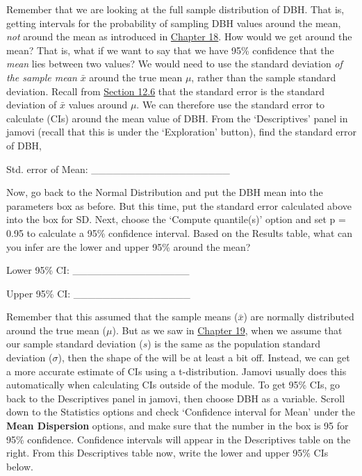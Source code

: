 \documentclass[
  openany]{krantz}
\begin{document}
Remember that we are looking at the full sample distribution of DBH.
That is, getting intervals for the probability of sampling DBH values around the mean, \emph{not}  around the mean as introduced in \protect\hyperlink{Chapter_18}{Chapter 18}.
How would we get  around the mean?
That is, what if we want to say that we have 95\% confidence that the \emph{mean} lies between two values?
We would need to use the standard deviation \emph{of the sample mean} \(\bar{x}\) around the true mean \(\mu\), rather than the sample standard deviation.
Recall from \protect\hyperlink{the-standard-error}{Section 12.6} that the standard error is the standard deviation of \(\bar{x}\) values around \(\mu\).
We can therefore use the standard error to calculate  (CIs) around the mean value of DBH.
From the `Descriptives' panel in jamovi (recall that this is under the `Exploration' button), find the standard error of DBH,

Std. error of Mean: \_\_\_\_\_\_\_\_\_\_\_\_\_\_\_\_\_\_\_

Now, go back to the  Normal Distribution and put the DBH mean into the parameters box as before.
But this time, put the standard error calculated above into the box for SD.
Next, choose the `Compute quantile(s)' option and set p = 0.95 to calculate a 95\% confidence interval.
Based on the Results table, what can you infer are the lower and upper 95\%  around the mean?

Lower 95\% CI: \_\_\_\_\_\_\_\_\_\_\_\_\_\_\_\_

Upper 95\% CI: \_\_\_\_\_\_\_\_\_\_\_\_\_\_\_\_

Remember that this assumed that the sample means (\(\bar{x}\)) are normally distributed around the true mean (\(\mu\)).
But as we saw in \protect\hyperlink{Chapter_19}{Chapter 19}, when we assume that our sample standard deviation (\(s\)) is the same as the population standard deviation (\(\sigma\)), then the shape of the  will be at least a bit off.
Instead, we can get a more accurate estimate of CIs using a t-distribution.
Jamovi usually does this automatically when calculating CIs outside of the  module.
To get 95\% CIs, go back to the Descriptives panel in jamovi, then choose DBH as a variable.
Scroll down to the Statistics options and check `Confidence interval for Mean' under the \textbf{Mean Dispersion} options, and make sure that the number in the box is 95 for 95\% confidence.
Confidence intervals will appear in the Descriptives table on the right.
From this Descriptives table now, write the lower and upper 95\% CIs below.
\end{document}
